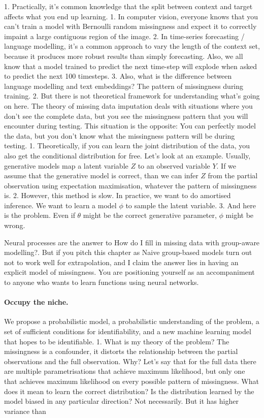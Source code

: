 \documentclass[a4paper,12pt,twoside,openright]{report}
\begin{document}
1. Practically, it's common knowledge that the split between context and target affects what you end up learning.
    1. In computer vision, everyone knows that you can't train a model with Bernoulli random missingness and expect it to correctly impaint a large contiguous region of the image.
    2. In time-series forecasting / language modelling, it's a common approach to vary the length of the context set, because it produces more robust results than simply forecasting. Also, we all know that a model trained to predict the next time-step will explode when asked to predict the next 100 timesteps.
    3. Also, what is the difference between language modelling and text embeddings? The pattern of missingness during training.
2. But there is not theoretical framework for understanding what's going on here. The theory of missing data imputation deals with situations where you don't see the complete data, but you see the missingness pattern that you will encounter during testing. This situation is the opposite: You can perfectly model the data, but you don't know what the missingness pattern will be during testing.
    1. Theoretically, if you can learn the joint distribution of the data, you also get the conditional distribution for free. Let's look at an example. Usually, generative models map a latent variable $Z$ to an observed variable $Y$. If we assume that the generative model is correct, than we can infer $Z$ from the partial observation using expectation maximisation, whatever the pattern of missingness is.
    2. However, this method is slow. In practice, we want to do amortised inference. We want to learn a model $\phi$ to sample the latent variable. 
    3. And here is the problem. Even if $\theta$ might be the correct generative parameter, $\phi$ might be wrong.

Neural processes are the answer to How do I fill in missing data with group-aware modelling?. But if you pitch this chapter as Naive group-based models turn out not to work well for extrapolation, and I claim the answer lies in having an explicit model of missingness. You are positioning yourself as an accompaniment to anyone who wants to learn functions using neural networks.

\paragraph{Occupy the niche.} We propose a probabilistic model, a probabilistic understanding of the problem, a set of sufficient conditions for identifiability, and a new machine learning model that hopes to be identifiable.
   1. What is my theory of the problem? The missingness is a confounder, it distorts the relationship between the partial observations and the full observation. Why? Let's say that for the full data there are multiple parametrisations that achieve maximum likelihood, but only one that achieves maximum likelihood on every possible pattern of missingness. What does it mean to learn the correct distribution? Is the distribution learned by the model biased in any particular direction? Not necessarily. But it has higher variance than
\end{document}
